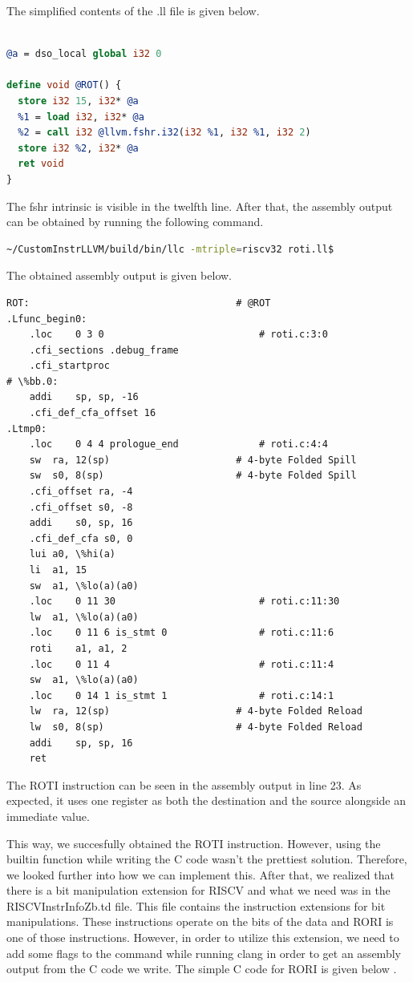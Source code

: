 The simplified contents of the .ll file is given below.

\begin{lstlisting}[language=llvm,style=nasm]

@a = dso_local global i32 0

define void @ROT() {
  store i32 15, i32* @a
  %1 = load i32, i32* @a
  %2 = call i32 @llvm.fshr.i32(i32 %1, i32 %1, i32 2)
  store i32 %2, i32* @a
  ret void
}
\end{lstlisting}

The fshr intrinsic is visible in the twelfth line. After that, the assembly output can be obtained by running the following command. 

\begin{lstlisting}[language=Bash]
~/CustomInstrLLVM/build/bin/llc -mtriple=riscv32 roti.ll$
\end{lstlisting}

The obtained assembly output is given below.

\begin{lstlisting}
ROT:                                    # @ROT
.Lfunc_begin0:
	.loc	0 3 0                           # roti.c:3:0
	.cfi_sections .debug_frame
	.cfi_startproc
# \%bb.0:
	addi	sp, sp, -16
	.cfi_def_cfa_offset 16
.Ltmp0:
	.loc	0 4 4 prologue_end              # roti.c:4:4
	sw	ra, 12(sp)                      # 4-byte Folded Spill
	sw	s0, 8(sp)                       # 4-byte Folded Spill
	.cfi_offset ra, -4
	.cfi_offset s0, -8
	addi	s0, sp, 16
	.cfi_def_cfa s0, 0
	lui	a0, \%hi(a)
	li	a1, 15
	sw	a1, \%lo(a)(a0)
	.loc	0 11 30                         # roti.c:11:30
	lw	a1, \%lo(a)(a0)
	.loc	0 11 6 is_stmt 0                # roti.c:11:6
	roti	a1, a1, 2
	.loc	0 11 4                          # roti.c:11:4
	sw	a1, \%lo(a)(a0)
	.loc	0 14 1 is_stmt 1                # roti.c:14:1
	lw	ra, 12(sp)                      # 4-byte Folded Reload
	lw	s0, 8(sp)                       # 4-byte Folded Reload
	addi	sp, sp, 16
	ret
\end{lstlisting}

The ROTI instruction can be seen in the assembly output in line 23. As expected, it uses one register as both  the destination and the source alongside an immediate value.

This way, we succesfully obtained the ROTI instruction. However, using the builtin function while writing the C code wasn’t the prettiest solution. Therefore, we looked further into how we can implement this. After that, we realized that there is a bit manipulation extension for RISCV and what we need was in the RISCVInstrInfoZb.td file. This file contains the instruction extensions for bit manipulations. These instructions operate on the bits of the data and RORI is one of those instructions. However, in order to utilize this extension, we need to add some flags to the command while running clang in order to get an assembly output from the C code we write. The simple C code for RORI is given below .%

